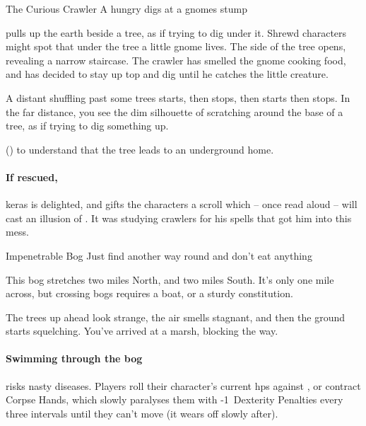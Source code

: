 \label{interruptions}

{The Curious Crawler}%
{A hungry  digs at a gnomes stump}%

 pulls up the earth beside a tree, as if trying to dig under it.
Shrewd characters might spot that under the tree a little gnome lives.
The side of the tree opens, revealing a narrow staircase.
The \gls{crawler} has smelled the gnome cooking food, and has decided to stay up top and dig until he catches the little creature.

\begin{boxtext}
  A distant shuffling past some trees starts, then stops, then starts then stops.
  In the far distance, you see the dim silhouette of  scratching around the base of a tree, as if trying to dig something up.
\end{boxtext}

 (\tn[9]) to understand that the tree leads to an underground home.

\chitincrawler

\keras

\paragraph{If rescued,}
\gls{keras} is delighted, and gifts the characters a scroll which -- once read aloud -- will cast an illusion of .
It was studying \glspl{crawler} for his spells that got him into this mess.

{Impenetrable Bog}%
{Just find another way round and don't eat anything}%

This bog stretches two miles North, and two miles South.
It's only one mile across, but crossing bogs requires a boat, or a sturdy constitution.

\begin{boxtext}
  The trees up ahead look strange, the air smells stagnant, and then the ground starts squelching.
  You've arrived at a marsh, blocking the way.
\end{boxtext}

\paragraph{Swimming through the bog}
risks nasty diseases.
Players roll their character's current \glspl{hp} against \tn[8], or contract Corpse Hands,%
which slowly paralyses them with -1~Dexterity Penalties every three \glspl{interval} until they can't move (it wears off slowly after).

